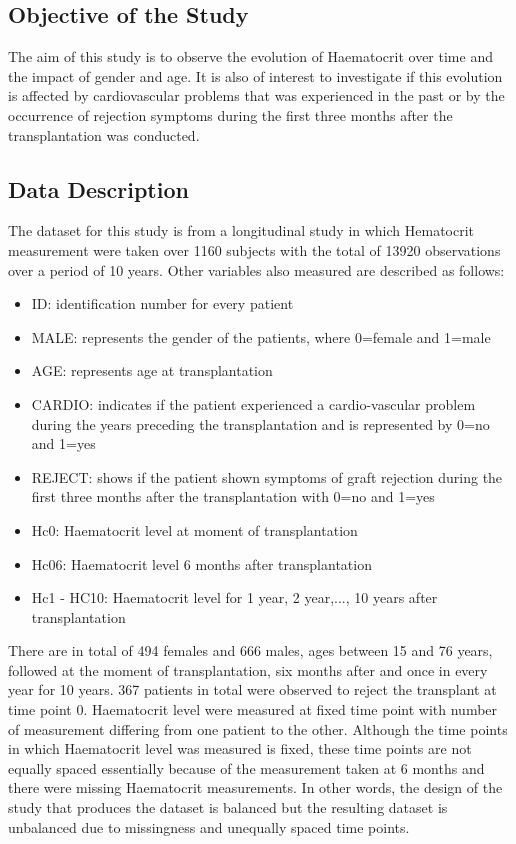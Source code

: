 \documentclass[11pt]{article}
\begin{document}
\subsection{Objective of the Study} 
The aim of this study is to observe the evolution of Haematocrit over time and the impact of gender and age. It is also of interest to investigate if this evolution is affected by cardiovascular problems that was experienced in the past or by the occurrence of rejection symptoms during the first three months after the transplantation was conducted. 

\subsection{Data Description}

The dataset for this study is from a longitudinal study in which Hematocrit measurement were taken over 1160 subjects with the total of 13920 observations over a period of 10 years. Other variables also measured are described as follows:
\begin{itemize}
\item  ID: identification number for every patient
\item  MALE: represents the gender of the patients, where 0=female and 1=male
\item  AGE: represents age at transplantation
\item CARDIO: indicates if the patient experienced a cardio-vascular problem during the years
preceding the transplantation and is represented by  0=no and 1=yes
\item  REJECT: shows if the patient shown symptoms of graft rejection during the first three
months after the transplantation with 0=no and 1=yes
\item  Hc0: Haematocrit level at moment of transplantation
\item  Hc06: Haematocrit level 6 months after transplantation
\item  Hc1 - HC10: Haematocrit level for 1 year, 2 year,..., 10 years after transplantation
\end{itemize}

\noindent There are in total of 494 females and 666 males, ages between 15 and 76 years, followed at the moment of transplantation, six months after and once in every year for 10 years. 367 patients in total were observed to reject the transplant at time point 0. Haematocrit level were measured at fixed time point with number of measurement differing from one patient to the other. Although the time points in which Haematocrit level was measured is fixed, these time points are not equally spaced essentially because of the measurement taken at 6 months and there were missing Haematocrit measurements. In other words, the design of the study that produces the dataset is balanced but the resulting dataset is unbalanced due to missingness and unequally spaced time points.
\end{document}
